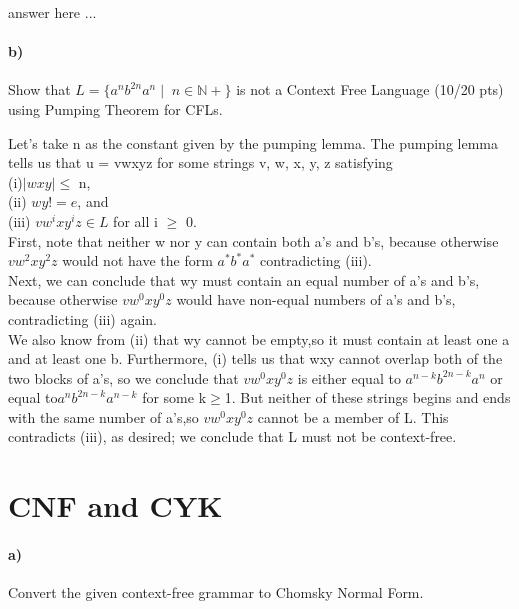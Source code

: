 \documentclass[a4paper,12pt]{article}
\begin{document}
\begin{tcolorbox}
answer here ...
\vspace{8cm} %
\end{tcolorbox}


\paragraph{b)} Show that $L=\{a^n b^{2n} a^n \mid \; n \in \mathbb{N+} \}$ is not a Context Free Language \hfill \small{(10/20 pts)} \\
using Pumping Theorem for CFLs. \\

\begin{tcolorbox}
Let's take n as the constant given by the pumping lemma. The pumping lemma tells us that u = vwxyz for some strings v, w, x, y, z satisfying \\
(i)$|wxy| \leq$ n, \\
(ii) $wy != e$, and \\
(iii) $v w^i x y^i z  \in L $ for all i $\geq$ 0. \\
First, note that neither w nor y can contain both a's and b's, because otherwise $v w^2 x y^2 z$ would not have the form $a^* b^* a^*$ contradicting (iii). \\
Next, we can conclude that wy must contain an equal number of a's and b's, because otherwise $v w^0 x y^0 z$ would have non-equal numbers of a's and b's, contradicting (iii) again. \\
We also know from (ii) that wy cannot be empty,so it must contain at least one a and at least one b. Furthermore, (i) tells us that wxy cannot overlap both of the two blocks of a's, so we conclude that $v w^0 x y^0 z$ is either equal to $a^{n-k} b^{2n-k} a^n$ or equal to$a^{n} b^{2n-k} a^{n-k}$ for some k$\geq$1. But neither of these strings begins and ends with the same number of a's,so $v w^0 x y^0 z$ cannot be a member of L. This contradicts (iii), as desired; we conclude that L must not be context-free.
\end{tcolorbox}





\newpage
\section{CNF and CYK \hfill {}}

\paragraph{a)} Convert the given context-free grammar to Chomsky Normal Form. \\
\end{document}
